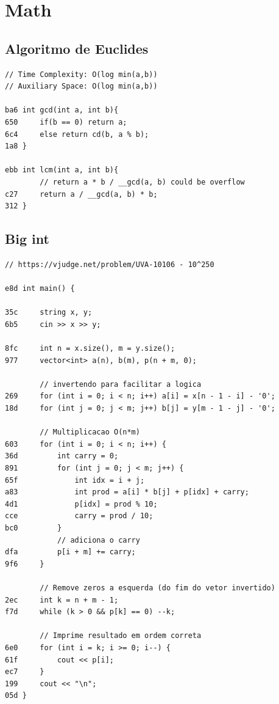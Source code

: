 \documentclass[11pt, a4paper, twoside]{article}
\begin{document}
\section{Math}

\subsection{Algoritmo de Euclides}
\begin{lstlisting}
// Time Complexity: O(log min(a,b))
// Auxiliary Space: O(log min(a,b))

ba6 int gcd(int a, int b){
650     if(b == 0) return a;
6c4     else return cd(b, a % b);
1a8 }

ebb int lcm(int a, int b){
        // return a * b / __gcd(a, b) could be overflow
c27     return a / __gcd(a, b) * b;
312 }
\end{lstlisting}

\subsection{Big int}
\begin{lstlisting}
// https://vjudge.net/problem/UVA-10106 - 10^250

e8d int main() {
    
35c     string x, y;
6b5     cin >> x >> y;
    
8fc     int n = x.size(), m = y.size();
977     vector<int> a(n), b(m), p(n + m, 0);
    
        // invertendo para facilitar a logica
269     for (int i = 0; i < n; i++) a[i] = x[n - 1 - i] - '0';
18d     for (int j = 0; j < m; j++) b[j] = y[m - 1 - j] - '0';
    
        // Multiplicacao O(n*m)
603     for (int i = 0; i < n; i++) {
36d         int carry = 0;
891         for (int j = 0; j < m; j++) {
65f             int idx = i + j;
a83             int prod = a[i] * b[j] + p[idx] + carry;
4d1             p[idx] = prod % 10;
cce             carry = prod / 10;
bc0         }
            // adiciona o carry
dfa         p[i + m] += carry;
9f6     }
    
        // Remove zeros a esquerda (do fim do vetor invertido)
2ec     int k = n + m - 1;
f7d     while (k > 0 && p[k] == 0) --k;
    
        // Imprime resultado em ordem correta
6e0     for (int i = k; i >= 0; i--) {
61f         cout << p[i];
ec7     }
199     cout << "\n";
05d }
\end{lstlisting}
\end{document}
